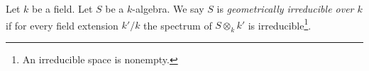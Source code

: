 \begin{definition}
\label{definition-geometrically-irreducible}
Let $k$ be a field.
Let $S$ be a $k$-algebra.
We say $S$ is {\it geometrically irreducible over $k$}
if for every field extension $k'/k$ the spectrum of
$S \otimes_k k'$ is irreducible\footnote{An irreducible space is nonempty.}.
\end{definition}